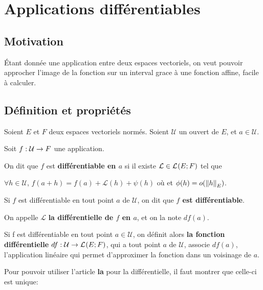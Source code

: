 \chapter{Applications différentiables}
\label{chap:differential}
\section*{Motivation}
	Étant donnée une application entre deux espaces vectoriels, on veut pouvoir
	approcher l'image de la fonction sur un interval grace à une fonction
	affine, facile à calculer.


\section{Définition et propriétés}


\begin{definition} 
\label{a_differential}
	Soient $E$ et $F$ deux espaces vectoriels normés.
	Soient $\mathcal{U}$ un ouvert de $E$, et $a \in \mathcal{U}$.

	Soit $f : \mathcal{U} \rightarrow F$ une application.

	On dit que $f$ est \textbf{différentiable en $a$} si il existe $\mathcal{L}
	\in \mathcal{L}_{}(E; F)$ tel que

	$\forall h \in \mathcal{U}$,
	$f(a + h) = f(a) + \mathcal{L}(h) + \psi(h)$ où
	et $\phi(h) = o(\norm{h}_{E})$.
\end{definition}

\begin{remarque}
	Si $f$ est différentiable en tout point $a$ de $\mathcal{U}$, on dit que
	\textbf{$f$ est différentiable}.
\end{remarque}

On appelle $\mathcal{L}$ \textbf{la différentielle de $f$ en $a$}, et on la note
$df(a)$.

Si f est différentiable en tout point $a \in \mathcal{U}$, on définit alors
\textbf{la fonction différentielle}
$df : \mathcal{U} \rightarrow \mathcal{L}_{}(E; F)$, qui a tout point $a$
de $\mathcal{U}$, associe $df(a)$, l'application linéaire qui permet
d'approximer la fonction dans un voisinage de $a$.

Pour pouvoir utiliser l'article \textbf{la} pour la différentielle, il faut
montrer que celle-ci est unique:

